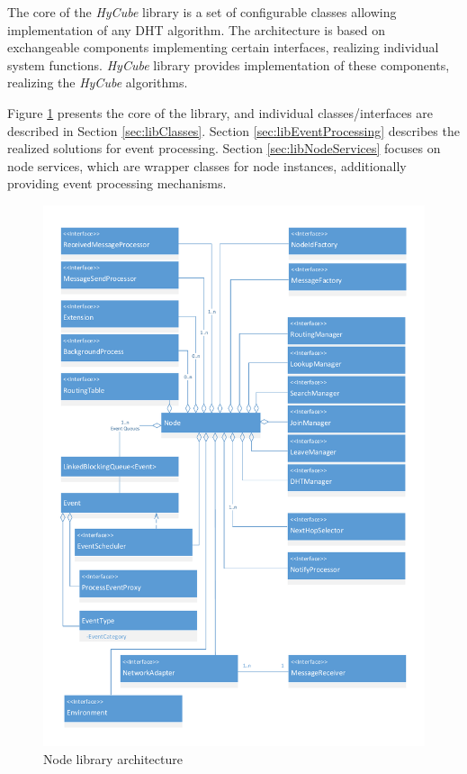 The core of the \emph{HyCube} library is a set of configurable classes allowing implementation of any DHT algorithm. The architecture is based on exchangeable components implementing certain interfaces, realizing individual system functions. \emph{HyCube} library provides implementation of these components, realizing the \emph{HyCube} algorithms.

Figure \ref{fig:HyCubeLibraryArchitecture} presents the core of the library, and individual classes/interfaces are described in Section \ref{sec:libClasses}. Section \ref{sec:libEventProcessing} describes the realized solutions for event processing. Section \ref{sec:libNodeServices} focuses on node services, which are wrapper classes for node instances, additionally providing event processing mechanisms.

\begin{figure}
\centering
\includegraphics[trim = 10mm 10mm 10mm 10mm, clip, scale=.84]{img/HyCubeLibraryNode.pdf}
\caption{Node library architecture}
\label{fig:HyCubeLibraryArchitecture}
\end{figure}




